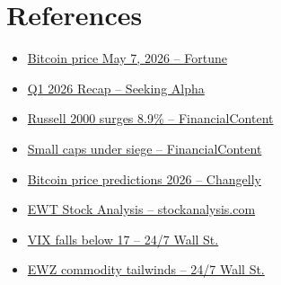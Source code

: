 \documentclass[11pt,letterpaper]{article}
\begin{document}
\section{References}

\begin{itemize}[nosep]
  \item \href{https://fortune.com/article/price-of-bitcoin-05-07-2026/}{Bitcoin price May 7, 2026 -- Fortune}
  \item \href{https://seekingalpha.com/article/4887991-q1-2026-recap}{Q1 2026 Recap -- Seeking Alpha}
  \item \href{https://markets.financialcontent.com/stocks/article/marketminute-2026-3-11-the-great-rotation-russell-2000-surges-89-as-small-cap-value-dethrones-tech-giants-in-2026}{Russell 2000 surges 8.9\% -- FinancialContent}
  \item \href{https://markets.financialcontent.com/stocks/article/marketminute-2026-3-23-small-caps-under-siege-russell-2000-enters-correction-as-yields-surge}{Small caps under siege -- FinancialContent}
  \item \href{https://changelly.com/blog/bitcoin-price-prediction/}{Bitcoin price predictions 2026 -- Changelly}
  \item \href{https://stockanalysis.com/etf/ewt/}{EWT Stock Analysis -- stockanalysis.com}
  \item \href{https://247wallst.com/investing/2026/05/01/the-cboe-vix-falls-to-16-level-as-risk-on-trade-returns-to-market/}{VIX falls below 17 -- 24/7 Wall St.}
  \item \href{https://247wallst.com/investing/2026/05/07/how-ewz-and-eww-investors-are-riding-commodity-and-supply-chain-tailwinds/}{EWZ commodity tailwinds -- 24/7 Wall St.}
\end{itemize}
\end{document}
